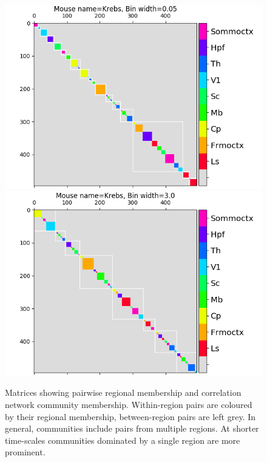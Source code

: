 \documentclass[a4paper,12pt]{article}
\theoremstyle{definition}
\begin{document}
\begin{figure}[t!]
    \centering
    \includegraphics[width=0.45\columnwidth]{images/Krebs_0p05_regional_cluster_map.png}
    \includegraphics[width=0.45\columnwidth]{images/Krebs_3p0_regional_cluster_map.png}
    \caption{Matrices showing pairwise regional membership and correlation network community membership. Within-region pairs are coloured by their regional membership, between-region pairs are left grey. In general, communities include pairs from multiple regions. At shorter time-scales communities dominated by a single region are more prominent.}
    \label{fig:regional_cluster_maps}
\end{figure}





\end{document}
